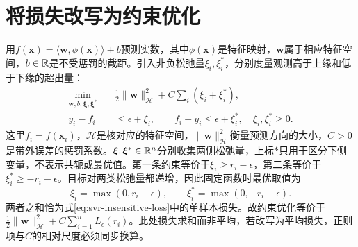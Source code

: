 \section{将损失改写为约束优化}
用$f(\bm x)=\langle\bm w,\phi(\bm x)\rangle+b$预测实数，其中$\phi(\bm x)$是特征映射，$\bm w$属于相应特征空间，$b\in\mathbb{R}$是不受惩罚的截距。引入非负松弛量$\xi_i,\xi_i^*$，分别度量观测高于上缘和低于下缘的超出量：
\begin{align}
 \min_{\bm w,b,\bm\xi,\bm\xi^*}\quad
 &\tfrac12\|\bm w\|_{\mathcal H}^2+C\sum_i(\xi_i+\xi_i^*),\label{eq:svr-primal}\\
 y_i-f_i&\le\epsilon+\xi_i,\qquad
 f_i-y_i\le\epsilon+\xi_i^*,\quad \xi_i,\xi_i^*\ge0.\nonumber
\end{align}
这里$f_i=f(\bm x_i)$，$\mathcal H$是核对应的特征空间，$\|\bm w\|_{\mathcal H}^2$衡量预测方向的大小，$C>0$是带外误差的惩罚系数。$\bm\xi,\bm\xi^*\in\mathbb{R}^n$分别收集两侧松弛量，上标$*$只用于区分下侧变量，不表示共轭或最优值。第一条约束等价于$\xi_i\ge r_i-\epsilon$，第二条等价于$\xi_i^*\ge-r_i-\epsilon$。目标对两类松弛量都递增，因此固定函数时最优取值为
\[
 \xi_i=\max(0,r_i-\epsilon),\qquad
 \xi_i^*=\max(0,-r_i-\epsilon).
\]
两者之和恰为式\eqref{eq:svr-insensitive-loss}中的单样本损失。故约束优化等价于$\tfrac12\|\bm w\|_{\mathcal H}^2+C\sum_{i=1}^nL_\epsilon(r_i)$。此处损失求和而非平均，若改写为平均损失，正则项与$C$的相对尺度必须同步换算。

